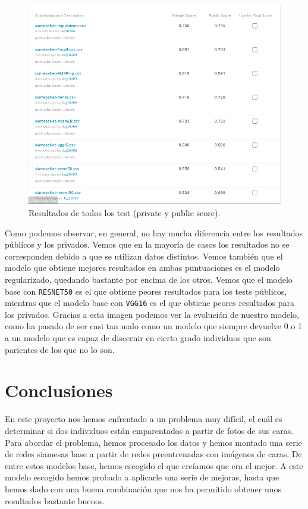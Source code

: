 \documentclass[11pt,a4paper]{article}
\begin{document}
\begin{figure}[H]
    \centering
    \includegraphics[scale=0.7]{img/siameseNet.png}
    \caption{Resultados de todos los test (private y public score).}
    \label{fig:test-regularizers}
\end{figure}

Como podemos observar, en general, no hay mucha diferencia entre los resultados públicos y los privados. Vemos que en la
mayoría de casos los resultados no se corresponden debido a que se utilizan datos distintos. Vemos también que el modelo
que obtiene mejores resultados en ambas puntuaciones es el modelo regularizado, quedando bastante por encima de los otros.
Vemos que el modelo base con \texttt{RESNET50} es el que obtiene peores resultados para los tests públicos, mientras
que el modelo base con \texttt{VGG16} es el que obtiene peores resultados para los privados. Gracias a esta imagen
podemos ver la evolución de nuestro modelo, como ha pasado de ser casi tan malo como un modelo que siempre devuelve
0 o 1 a un modelo que es capaz de discernir en cierto grado individuos que son parientes de los que no lo son.

\section{Conclusiones}

En este proyecto nos hemos enfrentado a un problema muy difícil, el cuál es determinar si dos individuos están
emparentados a partir de fotos de sus caras. Para abordar el problema, hemos procesado los datos y hemos montado
una serie de redes siamesas base a partir de redes preentrenadas con imágenes de caras. De entre estos modelos base,
hemos escogido el que creíamos que era el mejor. A este modelo escogido hemos probado a aplicarle una serie de
mejoras, hasta que hemos dado con una buena combinación que nos ha permitido obtener unos resultados bastante buenos.
\end{document}
